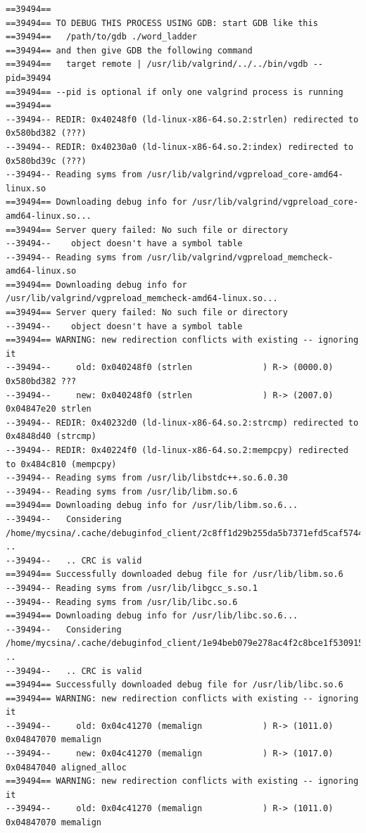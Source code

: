 \documentclass[a4paper,11pt]{article}
\begin{document}
\begin{lstlisting}
==39494== 
==39494== TO DEBUG THIS PROCESS USING GDB: start GDB like this
==39494==   /path/to/gdb ./word_ladder
==39494== and then give GDB the following command
==39494==   target remote | /usr/lib/valgrind/../../bin/vgdb --pid=39494
==39494== --pid is optional if only one valgrind process is running
==39494== 
--39494-- REDIR: 0x40248f0 (ld-linux-x86-64.so.2:strlen) redirected to 0x580bd382 (???)
--39494-- REDIR: 0x40230a0 (ld-linux-x86-64.so.2:index) redirected to 0x580bd39c (???)
--39494-- Reading syms from /usr/lib/valgrind/vgpreload_core-amd64-linux.so
==39494== Downloading debug info for /usr/lib/valgrind/vgpreload_core-amd64-linux.so...
==39494== Server query failed: No such file or directory
--39494--    object doesn't have a symbol table
--39494-- Reading syms from /usr/lib/valgrind/vgpreload_memcheck-amd64-linux.so
==39494== Downloading debug info for /usr/lib/valgrind/vgpreload_memcheck-amd64-linux.so...
==39494== Server query failed: No such file or directory
--39494--    object doesn't have a symbol table
==39494== WARNING: new redirection conflicts with existing -- ignoring it
--39494--     old: 0x040248f0 (strlen              ) R-> (0000.0) 0x580bd382 ???
--39494--     new: 0x040248f0 (strlen              ) R-> (2007.0) 0x04847e20 strlen
--39494-- REDIR: 0x40232d0 (ld-linux-x86-64.so.2:strcmp) redirected to 0x4848d40 (strcmp)
--39494-- REDIR: 0x40224f0 (ld-linux-x86-64.so.2:mempcpy) redirected to 0x484c810 (mempcpy)
--39494-- Reading syms from /usr/lib/libstdc++.so.6.0.30
--39494-- Reading syms from /usr/lib/libm.so.6
==39494== Downloading debug info for /usr/lib/libm.so.6...
--39494--   Considering /home/mycsina/.cache/debuginfod_client/2c8ff1d29b255da5b7371efd5caf57444d622838/debuginfo ..
--39494--   .. CRC is valid
==39494== Successfully downloaded debug file for /usr/lib/libm.so.6
--39494-- Reading syms from /usr/lib/libgcc_s.so.1
--39494-- Reading syms from /usr/lib/libc.so.6
==39494== Downloading debug info for /usr/lib/libc.so.6...
--39494--   Considering /home/mycsina/.cache/debuginfod_client/1e94beb079e278ac4f2c8bce1f53091548ea1584/debuginfo ..
--39494--   .. CRC is valid
==39494== Successfully downloaded debug file for /usr/lib/libc.so.6
==39494== WARNING: new redirection conflicts with existing -- ignoring it
--39494--     old: 0x04c41270 (memalign            ) R-> (1011.0) 0x04847070 memalign
--39494--     new: 0x04c41270 (memalign            ) R-> (1017.0) 0x04847040 aligned_alloc
==39494== WARNING: new redirection conflicts with existing -- ignoring it
--39494--     old: 0x04c41270 (memalign            ) R-> (1011.0) 0x04847070 memalign

\end{lstlisting}
\end{document}
